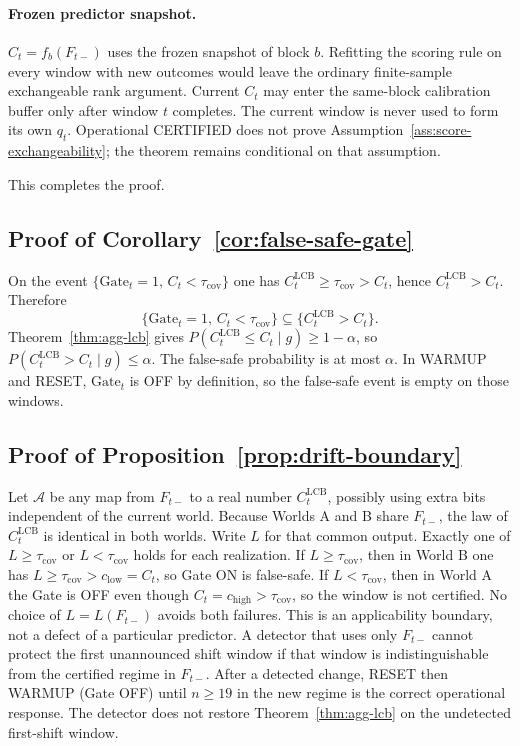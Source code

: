 \paragraph{Frozen predictor snapshot.}
$\widehat C_t=f_b(F_{t-})$ uses the frozen snapshot of block $b$.  Refitting
the scoring rule on every window with new outcomes would leave the ordinary
finite-sample exchangeable rank argument.  Current $C_t$ may enter the
same-block calibration buffer only after window $t$ completes.  The current
window is never used to form its own $q_t$.  Operational CERTIFIED does not
prove Assumption~\ref{ass:score-exchangeability}; the theorem remains
conditional on that assumption.

This completes the proof.

\subsection{Proof of Corollary~\ref{cor:false-safe-gate}}
\label{app:proof_false_safe}

On the event $\{\mathrm{Gate}_t=1,\,C_t<\tau_{\mathrm{cov}}\}$ one has
$C^{\mathrm{LCB}}_t\ge\tau_{\mathrm{cov}}>C_t$, hence
$C^{\mathrm{LCB}}_t>C_t$.  Therefore
\[
 \{\mathrm{Gate}_t=1,\,C_t<\tau_{\mathrm{cov}}\}
 \subseteq
 \{C^{\mathrm{LCB}}_t>C_t\}.
\]
Theorem~\ref{thm:agg-lcb} gives $P(C^{\mathrm{LCB}}_t\le C_t\mid g)\ge 1-\alpha$,
so $P(C^{\mathrm{LCB}}_t>C_t\mid g)\le\alpha$.  The false-safe probability is
at most $\alpha$.  In WARMUP and RESET, $\mathrm{Gate}_t$ is OFF by definition,
so the false-safe event is empty on those windows.

\subsection{Proof of Proposition~\ref{prop:drift-boundary}}
\label{app:proof_drift_boundary}

Let $\mathcal{A}$ be any map from $F_{t-}$ to a real number
$C^{\mathrm{LCB}}_t$, possibly using extra bits independent of the current
world.  Because Worlds A and B share $F_{t-}$, the law of
$C^{\mathrm{LCB}}_t$ is identical in both worlds.  Write $L$ for that common
output.  Exactly one of $L\ge\tau_{\mathrm{cov}}$ or $L<\tau_{\mathrm{cov}}$
holds for each realization.  If $L\ge\tau_{\mathrm{cov}}$, then in World B one
has $L\ge\tau_{\mathrm{cov}}>c_{\mathrm{low}}=C_t$, so Gate ON is false-safe.
If $L<\tau_{\mathrm{cov}}$, then in World A the Gate is OFF even though
$C_t=c_{\mathrm{high}}>\tau_{\mathrm{cov}}$, so the window is not certified.
No choice of $L=L(F_{t-})$ avoids both failures.  This is an applicability
boundary, not a defect of a particular predictor.  A detector that uses only
$F_{t-}$ cannot protect the first unannounced shift window if that window is
indistinguishable from the certified regime in $F_{t-}$.  After a detected
change, RESET then WARMUP (Gate OFF) until $n\ge 19$ in the new regime is the
correct operational response.  The detector does not restore
Theorem~\ref{thm:agg-lcb} on the undetected first-shift window.

